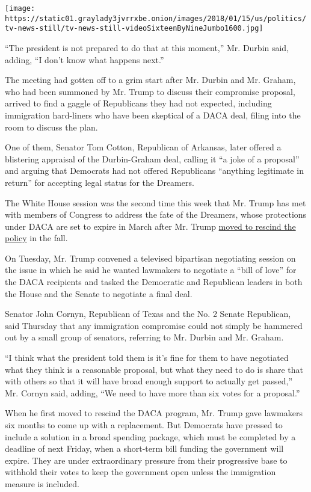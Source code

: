\texttt{[image: https://static01.graylady3jvrrxbe.onion/images/2018/01/15/us/politics/tv-news-still/tv-news-still-videoSixteenByNineJumbo1600.jpg]}

``The president is not prepared to do that at this moment,'' Mr. Durbin
said, adding, ``I don't know what happens next.''

The meeting had gotten off to a grim start after Mr. Durbin and Mr.
Graham, who had been summoned by Mr. Trump to discuss their compromise
proposal, arrived to find a gaggle of Republicans they had not expected,
including immigration hard-liners who have been skeptical of a DACA
deal, filing into the room to discuss the plan.

One of them, Senator Tom Cotton, Republican of Arkansas, later offered a
blistering appraisal of the Durbin-Graham deal, calling it ``a joke of a
proposal'' and arguing that Democrats had not offered Republicans
``anything legitimate in return'' for accepting legal status for the
Dreamers.

The White House session was the second time this week that Mr. Trump has
met with members of Congress to address the fate of the Dreamers, whose
protections under DACA are set to expire in March after Mr. Trump
\href{https://www.nytimes3xbfgragh.onion/2017/09/05/us/politics/trump-daca-dreamers-immigration.html}{moved
to rescind the policy} in the fall.

On Tuesday, Mr. Trump convened a televised bipartisan negotiating
session on the issue in which he said he wanted lawmakers to negotiate a
``bill of love'' for the DACA recipients and tasked the Democratic and
Republican leaders in both the House and the Senate to negotiate a final
deal.

Senator John Cornyn, Republican of Texas and the No. 2 Senate
Republican, said Thursday that any immigration compromise could not
simply be hammered out by a small group of senators, referring to Mr.
Durbin and Mr. Graham.

``I think what the president told them is it's fine for them to have
negotiated what they think is a reasonable proposal, but what they need
to do is share that with others so that it will have broad enough
support to actually get passed,'' Mr. Cornyn said, adding, ``We need to
have more than six votes for a proposal.''

When he first moved to rescind the DACA program, Mr. Trump gave
lawmakers six months to come up with a replacement. But Democrats have
pressed to include a solution in a broad spending package, which must be
completed by a deadline of next Friday, when a short-term bill funding
the government will expire. They are under extraordinary pressure from
their progressive base to withhold their votes to keep the government
open unless the immigration measure is included.

